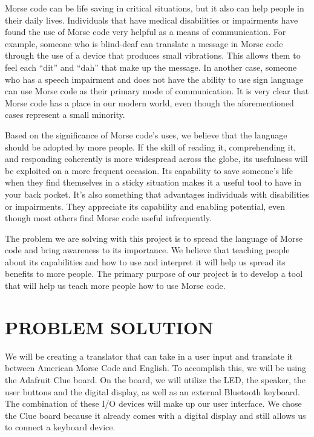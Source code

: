 \documentclass[12pt]{article}
\begin{document}
	Morse code can be life saving in critical situations, but it also can help people in their daily lives. Individuals that have medical disabilities or impairments have found the use of Morse code very helpful as a means of communication. For example, someone who is blind-deaf can translate a message in Morse code through the use of a device that produces small vibrations. This allows them to feel each “dit” and “dah” that make up the message. In another case, someone who has a speech impairment and does not have the ability to use sign language can use Morse code as their primary mode of communication. It is very clear that Morse code has a place in our modern world, even though the aforementioned cases represent a small minority.
	
	Based on the significance of Morse code’s uses, we believe that the language should be adopted by more people. If the skill of reading it, comprehending it, and responding coherently is more widespread across the globe, its usefulness will be exploited on a more frequent occasion. Its capability to save someone’s life when they find themselves in a sticky situation makes it a useful tool to have in your back pocket. It’s also something that advantages individuals with disabilities or impairments. They appreciate its capability and enabling potential, even though most others find Morse code useful infrequently.
	
	The problem we are solving with this project is to spread the language of Morse code and bring awareness to its importance. We believe that teaching people about its capabilities and how to use and interpret it will help us spread its benefits to more people. The primary purpose of our project is to develop a tool that will help us teach more people how to use Morse code.
	
	\section{PROBLEM SOLUTION}
	  We will be creating a translator that can take in a user input and translate it between American Morse Code and English. 
	 To accomplish this, we will be using the Adafruit Clue board. On the board, we will utilize the LED, the speaker, the user buttons and the digital display, as well as an external Bluetooth keyboard. The combination of these I/O devices will make up our user interface. We chose the Clue board because it already comes with a digital display and still allows us to connect a keyboard device.
	 
\end{document}

